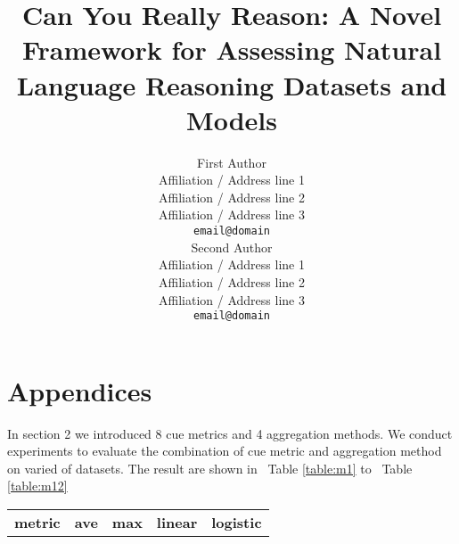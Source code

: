 \documentclass[11pt,a4paper]{article}
\title{Can You Really Reason: A Novel Framework for Assessing Natural Language Reasoning Datasets and Models}
\author{First Author \\
  Affiliation / Address line 1 \\
  Affiliation / Address line 2 \\
  Affiliation / Address line 3 \\
  \texttt{email@domain} \\\And
  Second Author \\
  Affiliation / Address line 1 \\
  Affiliation / Address line 2 \\
  Affiliation / Address line 3 \\
  \texttt{email@domain} \\}
\date{}
\newcommand{\tabref}[1]{Table \ref{#1}}
\begin{document}
\maketitle

\appendix

\section{Appendices}
\label{sec:appendix}
In section 2 we introduced 8 cue metrics and 4 aggregation methods. We conduct experiments to
evaluate the combination of cue metric and aggregation method on varied of datasets. 
The result are shown in ~\tabref{table:m1} to ~\tabref{table:m12}

\begin{table}[htbp]
\begin{tabular}{lllllllll}
\hline
\multicolumn{1}{c}{\multirow{2}{*}{\textbf{metric}}} & \multicolumn{2}{c}{\textbf{ave}}                                                                                                                                   & \multicolumn{2}{c}{\textbf{max}}                                                                                                                                  & \multicolumn{2}{c}{\textbf{linear}}                                                                                                                                & \multicolumn{2}{c}{\textbf{logistic}}                                                                                                                              \\ \cline{2-9} 

\end{tabular}
\end{table}
\end{document}
